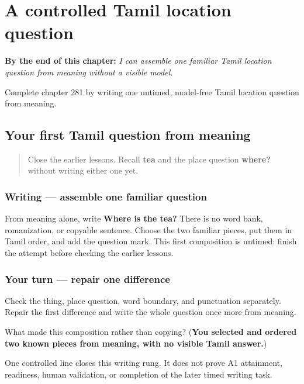 
\chapter{A controlled Tamil location question}
\label{ch:ta-a-controlled-tamil-location-question}

\begin{chapteropening}
\textbf{By the end of this chapter:} \emph{I can assemble one familiar Tamil location question from meaning without a visible model.}

Complete chapter 281 by writing one untimed, model-free Tamil location question from meaning.
\end{chapteropening}

\section[(controlled location question)]{Your first Tamil question from meaning}

\label{lesson:TA-W281-enge-controlled-question}



\begin{quote}
Close the earlier lessons. Recall \textbf{tea} and the place question \textbf{where?} without writing either one yet.
\end{quote}

\subsection*{Writing — assemble one familiar question}
From meaning alone, write \textbf{Where is the tea?} There is no word bank, romanization, or copyable sentence. Choose the two familiar pieces, put them in Tamil order, and add the question mark. This first composition is untimed: finish the attempt before checking the earlier lessons.

\subsection*{Your turn — repair one difference}
Check the thing, place question, word boundary, and punctuation separately. Repair the first difference and write the whole question once more from meaning.

\begin{tcolorbox}[breakable,colback=teal!4,colframe=teal!35!black,title={Before you move on}]
What made this composition rather than copying? (\textbf{You selected and ordered two known pieces from meaning, with no visible Tamil answer.})

One controlled line closes this writing rung. It does not prove A1 attainment, readiness, human validation, or completion of the later timed writing task.
\end{tcolorbox}
